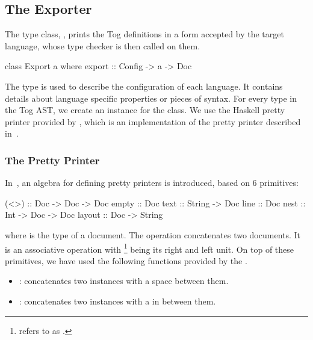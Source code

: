 \subsection{The Exporter} 
\label{sec:impl:exporter}
The type class, , prints the Tog definitions in a form accepted by the target language, whose type checker is then called on them. 
\begin{hscode}
class Export a where
  export :: Config -> a -> Doc  
\end{hscode}
The  type is used to describe the configuration of each language. It contains details about language specific properties or pieces of syntax. 
For every type in the Tog AST, we create an instance for the  class.
We use the Haskell pretty printer provided by , which is an implementation of the pretty printer described in~\cite{wadler2003prettier}. 

\subsubsection{The Pretty Printer}
In~\cite{wadler2003prettier}, an algebra for defining pretty printers is introduced, based on $6$ primitives: 
\begin{hscode}
(<>) :: Doc -> Doc -> Doc 
empty  :: Doc 
text :: String -> Doc 
line :: Doc 
nest :: Int -> Doc -> Doc 
layout :: Doc -> String 
\end{hscode}
\noindent where  is the type of a document. The \lstmath{(<>)} operation concatenates two documents. It is an associative operation with \footnote{\cite{wadler2003prettier} refers to  as .} being its right and left unit. 
On top of these primitives, we have used the following functions provided by the 
. 
\begin{itemize}
\item \lstmath{(<+>)} : concatenates two  instances with a space between them. 
\item \lstmath{(<$\$\$$>)} : concatenates two  instances with a  in between them. 
\end{itemize}

